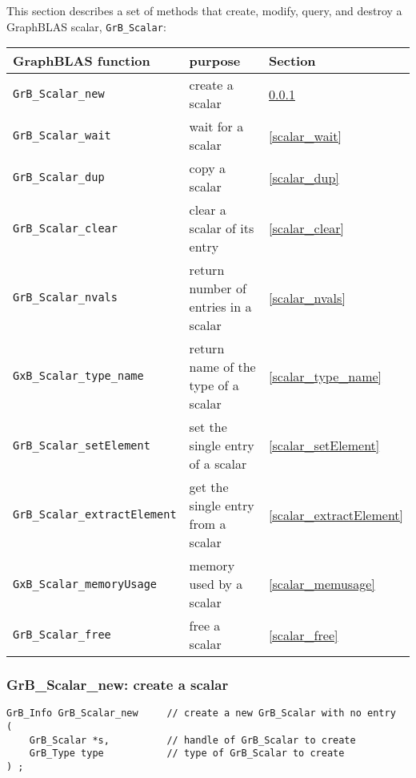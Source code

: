 \documentclass[12pt]{article}
\begin{document}
This section describes a set of methods that create, modify, query,
and destroy a GraphBLAS scalar, \verb'GrB_Scalar':

\vspace{0.2in}
{\footnotesize
\begin{tabular}{lll}
\hline
GraphBLAS function   & purpose                                      & Section \\
\hline
\verb'GrB_Scalar_new'            & create a scalar                      & \ref{scalar_new} \\
\verb'GrB_Scalar_wait'           & wait for a scalar                    & \ref{scalar_wait} \\
\verb'GrB_Scalar_dup'            & copy a scalar                        & \ref{scalar_dup} \\
\verb'GrB_Scalar_clear'          & clear a scalar of its entry          & \ref{scalar_clear} \\
\verb'GrB_Scalar_nvals'          & return number of entries in a scalar & \ref{scalar_nvals}  \\
\verb'GxB_Scalar_type_name'      & return name of the type of a scalar  & \ref{scalar_type_name} \\
\verb'GrB_Scalar_setElement'     & set the single entry of a scalar     & \ref{scalar_setElement} \\
\verb'GrB_Scalar_extractElement' & get the single entry from a scalar   & \ref{scalar_extractElement} \\
\verb'GxB_Scalar_memoryUsage'    & memory used by a scalar              & \ref{scalar_memusage} \\
\verb'GrB_Scalar_free'           & free a scalar                        & \ref{scalar_free} \\
\hline
\end{tabular}
}

\subsubsection{{\sf GrB\_Scalar\_new:} create a scalar}
\label{scalar_new}

\begin{mdframed}[userdefinedwidth=6in]
{\footnotesize
\begin{verbatim}
GrB_Info GrB_Scalar_new     // create a new GrB_Scalar with no entry
(
    GrB_Scalar *s,          // handle of GrB_Scalar to create
    GrB_Type type           // type of GrB_Scalar to create
) ;
\end{verbatim}
} \end{mdframed}
\end{document}
